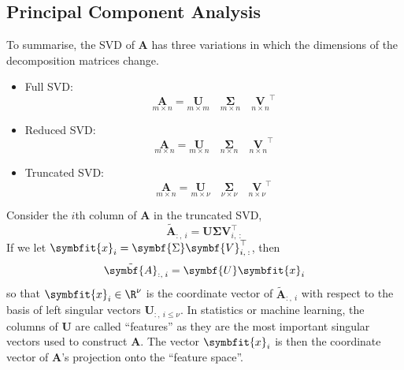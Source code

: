 \documentclass{article}
\begin{document}
\begin{multicols*}{3}
    \subsection{Principal Component Analysis}
    To summarise, the SVD of \(\symbf{A}\) has three variations in which the dimensions of the decomposition matrices change.
    \begin{itemize}
        \item Full SVD\@:
              \begin{equation*}
                  \underset{m \times n}{\symbf{A}} = \underset{m \times m}{\symbf{U}} \quad \underset{m \times n}{\symbf{\Sigma}} \quad \underset{n \times n}{\symbf{V}}^\top
              \end{equation*}
        \item Reduced SVD\@:
              \begin{equation*}
                  \underset{m \times n}{\symbf{A}} = \underset{m \times n}{\symbf{U}} \quad \underset{n \times n}{\symbf{\Sigma}} \quad \underset{n \times n}{\symbf{V}}^\top
              \end{equation*}
        \item Truncated SVD\@:
              \begin{equation*}
                  \underset{m \times n}{\symbf{A}} = \underset{m \times \nu}{\symbf{U}} \quad \underset{\nu \times \nu}{\symbf{\Sigma}} \quad \underset{n \times \nu}{\symbf{V}}^\top
              \end{equation*}
    \end{itemize}
    Consider the \(i\)th column of \(\symbf{A}\) in the truncated SVD,
    \begin{equation*}
        \tilde{\symbf{A}}_{:,\:i} = \symbf{U} \symbf{\Sigma} \symbf{V}_{i,\: :}^\top
    \end{equation*}
    If we let \(\symbfit{x}_i = \symbf{\Sigma} \symbf{V}_{i,\: :}^\top\), then
    \begin{equation*}
        \tilde{\symbf{A}}_{:,\:i} = \symbf{U} \symbfit{x}_i
    \end{equation*}
    so that \(\symbfit{x}_i \in \R^{\nu}\) is the coordinate vector of \(\tilde{\symbf{A}}_{:,\:i}\) with respect to the basis of left
    singular vectors \(\symbf{U}_{:,\: i \leq \nu}\). In statistics or machine learning, the columns of \(\symbf{U}\) are called ``features''
    as they are the most important singular vectors used to construct \(\symbf{A}\). The vector \(\symbfit{x}_i\) is then the coordinate
    vector of \(\symbf{A}\)'s projection onto the ``feature space''.


\end{multicols*}
\end{document}
